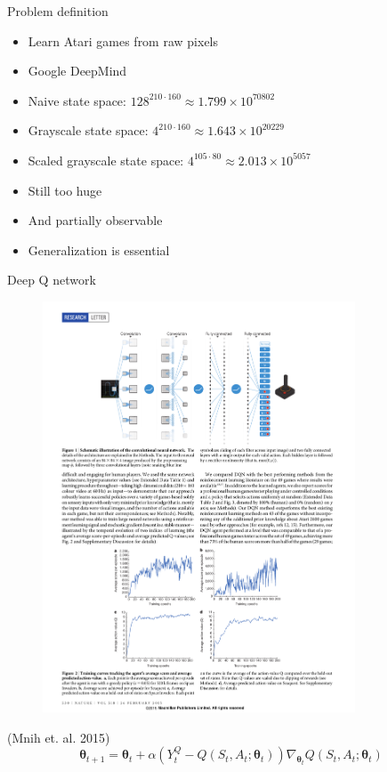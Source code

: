 \documentclass{beamer}
\begin{document}
\begin{frame}{Problem definition}
  \begin{itemize}
  \item {
    Learn Atari games from raw pixels
  }
  \item {
    Google DeepMind
  }
  \item {
      Naive state space: $128^{210 \cdot 160} \approx 1.799\times 10^{70802}$
  }
  \item {
      Grayscale state space: $4^{210 \cdot 160} \approx 1.643\times 10^{20229}$
  }
  \item {
      Scaled grayscale state space: $4^{105 \cdot 80} \approx 2.013\times 10^{5057}$
  }
  \item {
    Still too huge
  }
  \item {
    And partially observable
  }
  \item {
    Generalization is essential
  }
  \end{itemize}
\end{frame}

\begin{frame}{Deep Q network}
  \begin{figure}[H]
    \centering
    \includegraphics[width=93mm]{deep_q_network.pdf}
  \end{figure}
  (Mnih et. al. 2015)
  \[ \boldsymbol{\theta}_{t+1} = \boldsymbol{\theta}_t+\alpha(Y_t^Q-Q(S_t,A_t;\boldsymbol{\theta}_t))\nabla_{\boldsymbol{\theta}_t}Q(S_t,A_t;\boldsymbol{\theta}_t) \]
\end{frame}
\end{document}
